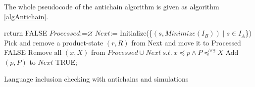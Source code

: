The whole pseudocode of the antichain algorithm is given as algorithm \ref{algAntichain}.

\begin{algorithm}[H]
	\label{algAntichain}
			{return FALSE\;}
		$Processed$:=$\varnothing$\;
		$Next$:= Initialize(\{$(s,Minimize(I_B))\mid s\in I_A$\})\;
		{
			Pick and remove a product-state $(r,R)$ from Next and move it to Processed\;
			{
				{
					\Return FALSE\;}
					{
						{
							{
							 Remove all $(x,X)$ from $Processed\cup Next\ s.t.\ x\preceq p \wedge P\preceq^{\forall \exists}X$\;
							 Add $(p,P)$ to $Next$\;
							}
						}
				 }
		  }
		}
		\Return TRUE;
	\caption{Language inclusion checking with antichains and simulations}
\end{algorithm}\

